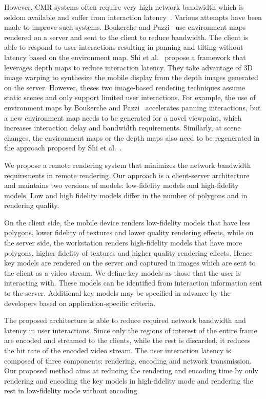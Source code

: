 However, CMR systems often require very high network bandwidth which is seldom available and suffer from interaction latency~\cite{chen2014}. Various attempts have been made to improve such systems. 
Boukerche and Pazzi~\cite{boukerche2006} use environment maps rendered on a server and sent to the client to reduce bandwidth. The client is able to respond to user interactions resulting in panning and tilting without latency based on the environment map.
Shi et al.~\cite{shi2012} propose a framework that leverages depth maps to reduce interaction latency. They take advantage of 3D image warping to synthesize the mobile display from the depth images generated on the server.
However, theses two image-based rendering techniques assume static scenes and only support limited user interactions.
For example, the use of environment maps by Boukerche and Pazzi~\cite{boukerche2006} accelerates panning interactions, but a new environment map needs to be generated for a novel viewpoint, which increases interaction delay and bandwidth requirements. Similarly, at scene changes, the environment maps or the depth maps also need to be regenerated in the approach proposed by Shi et al.~\cite{shi2012}.

We propose a remote rendering system that minimizes the network bandwidth requirements in remote rendering.
Our approach is a client-server architecture and maintains two versions of models: low-fidelity models and high-fidelity models.
Low and high fidelity models differ in the number of polygons and in rendering quality.

On the client side, the mobile device renders low-fidelity models that have less polygons, lower fidelity of textures and lower quality rendering effects, while on the server side, the workstation renders high-fidelity models that have more polygons, higher fidelity of textures and higher quality rendering effects. Hence key models are rendered on the server and captured in images which are sent to the client as a video stream. We define key models as those that the user is interacting with. These models can be identified from interaction information sent to the server. Additional key models may be specified in advance by the developers based on application-specific criteria.

The proposed architecture is able to reduce required network bandwidth and latency in user interactions.
Since only the regions of interest of the entire frame are encoded and streamed to the clients, while the rest is discarded, it reduces the bit rate of the encoded video stream.
The user interaction latency is composed of three components: rendering, encoding and network transmission. Our proposed method aims at reducing the rendering and encoding time by only rendering and encoding the key models in high-fidelity mode and rendering the rest in low-fidelity mode without encoding.

